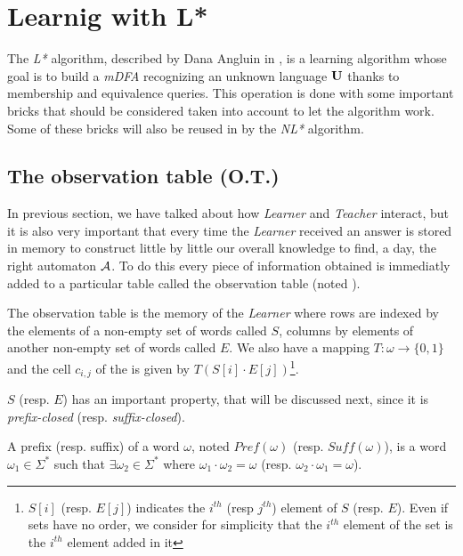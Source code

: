 \section{Learnig with L* }
\label{section:L}

The \textit{L*} algorithm, described by Dana Angluin in \cite{LPaper}, is a learning algorithm whose goal is to build a \textit{mDFA} recognizing an unknown language $\mathbf{U}$ thanks to membership and equivalence queries. This operation is done with some important bricks that should be considered taken into account to let the algorithm work. Some of these bricks will also be reused in by the \textit{NL*} algorithm.

\subsection{The observation table (O.T.)}
In previous section, we have talked about how \textit{Learner} and \textit{Teacher} interact, but it is also very important that every time the \textit{Learner} received an answer is stored in memory to construct little by little our overall knowledge to find, a day, the right automaton $\mathcal{A}$. To do this every piece of information obtained is immediatly added to a particular table called the observation table (noted \OT).

\begin{definition}
  The observation table is the memory of the \textit{Learner} where rows are indexed by the elements of a non-empty set of words called $S$, columns by elements of another non-empty set of words called $E$. We also have a mapping $T : \omega \rightarrow \{0, 1\}$ and the cell $c_{i,j}$ of the \OT is given by $T(S[i] \cdot E[j])$\footnote{$S[i]$ (resp. $E[j]$) indicates the $i^{th}$ (resp $j^{th}$) element of $S$ (resp. $E$). Even if sets have no order, we consider for simplicity that the $i^{th} $ element of the set is the $i^{th}$ element added in it}.
\end{definition}

$S$ (resp. $E$) has an important property, that will be discussed next, since it is \textit{prefix-closed} (resp. \textit{suffix-closed}).

\begin{definition}
  A prefix (resp. suffix) of a word $\omega$, noted $Pref(\omega)$ (resp. $Suff(\omega)$), is a word $\omega_1 \in \Sigma^*$ such that $\exists \omega_2 \in \Sigma^*$ where $\omega_1 \cdot \omega_2 = \omega$ (resp. $\omega_2 \cdot \omega_1 = \omega$).
\end{definition}

